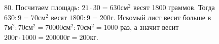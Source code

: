 80. Посчитаем площадь: $21\cdot30=630\text{см}^2$ весят 1800 граммов. Тогда $630:9=70\text{см}^2$ весят $1800:9=200$г. Искомый лист весит больше в $7\text{м}^2:70\text{см}^2=70000\text{см}^2:70\text{см}^2=1000$ раз, а значит весит $200\text{г}\cdot1000=200000\text{г}=200$кг.\\
